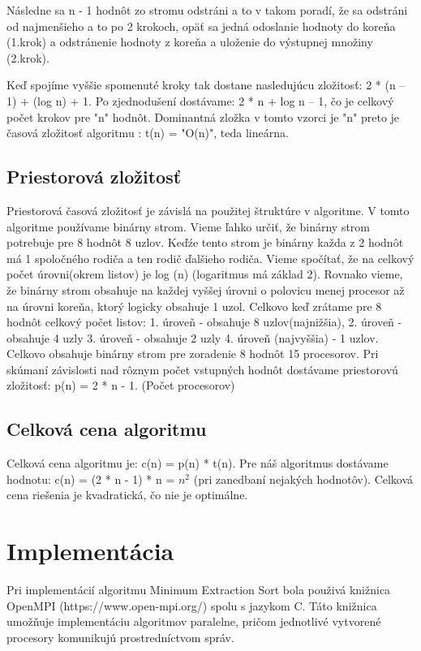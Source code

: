 \documentclass[12pt,a4paper,titlepage,final]{article}
\begin{document}
Následne sa n - 1 hodnôt zo stromu odstráni a to v takom poradí, že sa odstráni od najmenšieho a to po 2 krokoch, opäť sa jedná odoslanie hodnoty do koreňa (1.krok) a odstránenie hodnoty z koreňa a uloženie do výstupnej množiny (2.krok).

Keď spojíme vyššie spomenuté kroky tak dostane nasledujúcu zložitosť: 2 * (n – 1) + (log n) + 1. Po zjednodušení dostávame: 2 * n + log n – 1, čo je celkový počet krokov pre "n" hodnôt. Dominantná zložka v tomto vzorci je "n" preto je časová zložitosť algoritmu : t(n) = "O(n)", teda lineárna.

\subsection{Priestorová zložitosť}
Priestorová časová zložitosť je závislá na použitej štruktúre v algoritme. V tomto algoritme používame binárny strom. Vieme ľahko určiť, že binárny strom potrebuje pre 8 hodnôt 8 uzlov. Keďźe tento strom je binárny každa z 2 hodnôt má 1 spoločného rodiča a ten rodič ďalšieho rodiča.
Vieme spočítať, že na celkový počet úrovni(okrem listov) je log (n) (logaritmus má základ 2). Rovnako vieme, že binárny strom obsahuje na každej vyššej úrovni o polovicu menej procesor až na úrovni koreňa, ktorý logicky obsahuje 1 uzol. Celkovo keď zrátame pre 8 hodnôt celkový počet listov: 1. úroveň - obsahuje 8 uzlov(najnižšia), 2. úroveň - obsahuje 4 uzly 3. úroveň  - obsahuje 2 uzly 4. úroveň (najvyššia) - 1 uzlov. Celkovo obsahuje binárny strom pre zoradenie 8 hodnôt 15 procesorov. Pri skúmaní závislosti nad rôznym počet vstupných hodnôt dostávame priestorovú zložitosť: p(n) = 2 * n - 1. (Počet procesorov)
\subsection{Celková cena algoritmu}
Celková cena algoritmu je: c(n) = p(n) * t(n). Pre náš algoritmus dostávame hodnotu: c(n) = (2 * n - 1) * n = $n^2$ (pri zanedbaní nejakých hodnotôv). Celková cena riešenia je kvadratická, čo nie je optimálne. 

\section{Implementácia}
Pri implementácií algoritmu Minimum Extraction Sort bola použivá knižnica OpenMPI (https://www.open-mpi.org/) spolu s jazykom C. Táto knižnica umožňuje implementáciu algoritmov paralelne, pričom jednotlivé vytvorené procesory komunikujú prostredníctvom správ.
\end{document}
